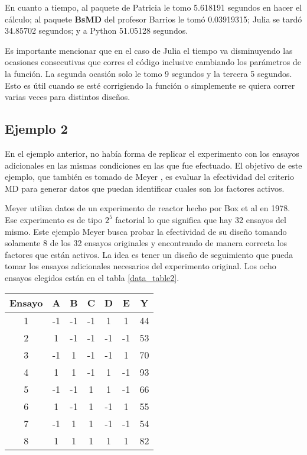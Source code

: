 En cuanto a tiempo, al paquete de Patricia le tomo 5.618191 segundos en hacer el cálculo; al paquete \textbf{BsMD} del profesor Barrios le tomó 0.03919315; Julia se tardó 34.85702 segundos;  y a Python 51.05128 segundos. 

Es importante mencionar que en el caso de Julia el tiempo va disminuyendo las ocasiones consecutivas que corres el código inclusive cambiando los parámetros de la función. La segunda ocasión solo le tomo 9 segundos y la tercera 5 segundos. Esto es útil cuando se esté corrigiendo la función o simplemente se quiera correr varias veces para distintos diseños. 


\subsection{Ejemplo 2 }
En el ejemplo anterior, no había forma de replicar el experimento con los ensayos adicionales en las mismas condiciones en las que fue efectuado. El objetivo de este ejemplo, que también es tomado de Meyer \cite{meyer1996}, es evaluar la efectividad del criterio MD para generar datos que puedan identificar cuales son los factores activos.

Meyer utiliza datos de un experimento de reactor hecho por Box et al en 1978. Ese experimento es de tipo $2^{5}$ factorial lo que significa que hay 32 ensayos del mismo. Este ejemplo Meyer busca probar la efectividad de su diseño tomando solamente 8 de los 32 ensayos originales y encontrando de manera correcta los factores que están activos. La idea es tener un diseño de seguimiento que pueda tomar los ensayos adicionales necesarios del experimento original. 
Los ocho ensayos elegidos están en el tabla \ref{data_table2}. 

\begin{center}
	\begin{tabular}{cccccc|c}
		Ensayo & A & B & C & D & E & Y \\
		\hline
		1 & -1 & -1 & -1 & 1 & 1 & 44 \\
		
		2 & 1 & -1 & -1 & -1 & -1 & 53 \\
		
		3 & -1 & 1 & -1 & -1 & 1 & 70 \\
		
		4 & 1 & 1 & -1 & 1 & -1 & 93 \\
		
		5 & -1 & -1 & 1 & 1 & -1 & 66 \\

		6 & 1 & -1 & 1 & -1 & 1 & 55 \\
		
		7 & -1 & 1 & 1 & -1 & -1 & 54 \\
		
		8 & 1 & 1 & 1 & 1 & 1 & 82 \\	
		
	\end{tabular}
	 \label{data_table2}
\end{center}

